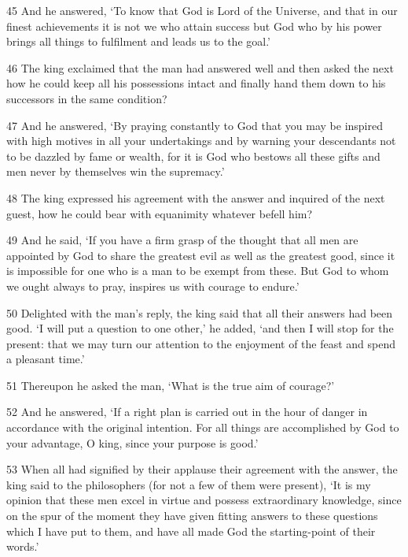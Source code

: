 \par 45 And he answered, ‘To know that God is Lord of the Universe, and that in our finest achievements it is not we who attain success but God who by his power brings all things to fulfilment and leads us to the goal.’

\par 46 The king exclaimed that the man had answered well and then asked the next how he could keep all his possessions intact and finally hand them down to his successors in the same condition?

\par 47 And he answered, ‘By praying constantly to God that you may be inspired with high motives in all your undertakings and by warning your descendants not to be dazzled by fame or wealth, for it is God who bestows all these gifts and men never by themselves win the supremacy.’

\par 48 The king expressed his agreement with the answer and inquired of the next guest, how he could bear with equanimity whatever befell him?

\par 49 And he said, ‘If you have a firm grasp of the thought that all men are appointed by God to share the greatest evil as well as the greatest good, since it is impossible for one who is a man to be exempt from these. But God to whom we ought always to pray, inspires us with courage to endure.’

\par 50 Delighted with the man's reply, the king said that all their answers had been good. ‘I will put a question to one other,’ he added, ‘and then I will stop for the present: that we may turn our attention to the enjoyment of the feast and spend a pleasant time.’

\par 51 Thereupon he asked the man, ‘What is the true aim of courage?’

\par 52 And he answered, ‘If a right plan is carried out in the hour of danger in accordance with the original intention. For all things are accomplished by God to your advantage, O king, since your purpose is good.’

\par 53 When all had signified by their applause their agreement with the answer, the king said to the philosophers (for not a few of them were present), ‘It is my opinion that these men excel in virtue and possess extraordinary knowledge, since on the spur of the moment they have given fitting answers to these questions which I have put to them, and have all made God the starting-point of their words.’

